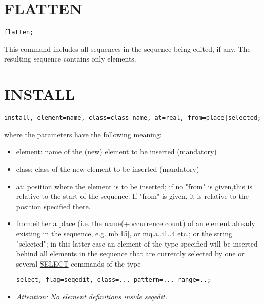 \section{FLATTEN}
\label{sec:seqedit_flatten}
\begin{verbatim}
flatten;
\end{verbatim} 
This command includes all sequences in the sequence being edited, if
any. The resulting sequence contains only elements.  

\section{INSTALL}
\begin{verbatim}
install, element=name, class=class_name, at=real, from=place|selected;
\end{verbatim} 
where the parameters have the following meaning: 
\begin{itemize}
   \item element: name of the (new) element to be inserted (mandatory) 
   \item class: class of the new element to be inserted (mandatory) 
   \item at: position where the element is to be inserted; if no "from"
     is given,this is relative to the start of the sequence. If "from"
     is given, it is relative to the position specified there. 
   \item from:either a place (i.e. the name(+occurrence count) of an
     element already existing in the sequence, e.g. mb[15], or
     mq.a..i1..4 etc.; or the string "selected"; in this latter case an
     element of the type specified will be inserted behind all elements
     in the sequence that are currently selected by one or several
     \href{../Introduction/select.html}{SELECT} commands of the type 
\begin{verbatim}
select, flag=seqedit, class=.., pattern=.., range=..;
\end{verbatim} 
   \item \textit{ Attention: No element definitions inside seqedit. }
\end{itemize}

